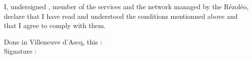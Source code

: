 \documentclass[12pt]{article}
\begin{document}
\vspace*{0.5cm}

I, undersigned \makebox[75mm]{\dotfill}, member of the services and the network managed by the Rézoléo, declare that I have read and understood the conditions mentionned above and that I agree to comply with them.

\vspace*{0.5cm}

\begin{flushright}
	\begin{minipage}{0.5\linewidth}
	Done in Villeneuve d'Ascq, this : \dotfill\\
	Signature :
	\end{minipage}
\end{flushright}
\end{document}
